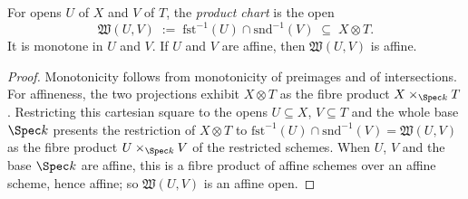 \begin{definition}
  \label{def:productChart}
  \leanok
  For opens \(U\) of \(X\) and \(V\) of \(T\), the \emph{product chart} is the open
  \[
    \mathfrak W(U,V) \;:=\; \mathrm{fst}^{-1}(U) \cap \mathrm{snd}^{-1}(V) \;\subseteq\; X \otimes T .
  \]
  It is monotone in \(U\) and \(V\). If \(U\) and \(V\) are affine, then \(\mathfrak W(U,V)\) is
  affine.
\end{definition}
\begin{proof}
  \leanok
  Monotonicity follows from monotonicity of preimages and of intersections. For affineness, the
  two projections exhibit \(X \otimes T\) as the fibre product \(X \times_{\Spec k} T\).
  Restricting this cartesian square to the opens \(U \subseteq X\), \(V \subseteq T\) and the
  whole base \(\Spec k\) presents the restriction of \(X \otimes T\) to
  \(\mathrm{fst}^{-1}(U) \cap \mathrm{snd}^{-1}(V) = \mathfrak W(U,V)\) as the fibre product
  \(U \times_{\Spec k} V\) of the restricted schemes. When \(U\), \(V\) and the base \(\Spec k\)
  are affine, this is a fibre product of affine schemes over an affine scheme, hence affine; so
  \(\mathfrak W(U,V)\) is an affine open.
\end{proof}

